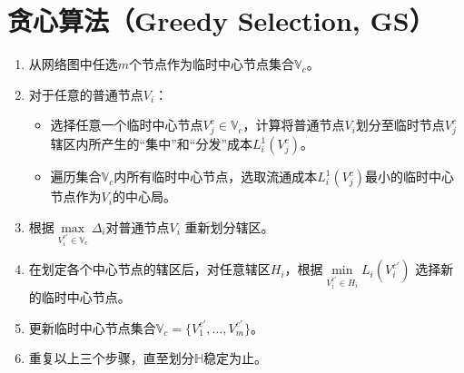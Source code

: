%


\section{贪心算法（Greedy Selection, GS）}
\begin{enumerate}[1、]
  \item 从网络图中任选$m$个节点作为临时中心节点集合$\mathbb V_c$。
  \item 对于任意的普通节点$V_i$：
  \begin{itemize}
      \item  选择任意一个临时中心节点$V_j^c\in \mathbb{V}_c$，计算将普通节点$V_i$划分至临时节点$V_j^c$ 辖区内所产生的“集中”和“分发”成本$L_i^1(V_j^c)$。
      \item 遍历集合$\mathbb V_c$内所有临时中心节点，选取流通成本$L_i^1(V_j^c)$最小的临时中心节点作为$V_i$的中心局。
  \end{itemize}
  \item 根据$\max\limits_{V_i^{c'}\in \mathbb V_c} \Delta_i$对普通节点$V_i$ 重新划分辖区。
  \item 在划定各个中心节点的辖区后，对任意辖区$H_i$，根据$\min\limits_{V_i^{c'} \in H_i} L_i(V_i^{c'})$ 选择新的临时中心节点。
  \item 更新临时中心节点集合$\mathbb V_c=\{V_1^{c'},\ldots,V_m^{c'}\}$。
  \item 重复以上三个步骤，直至划分$\mathbb H$稳定为止。
\end{enumerate}

